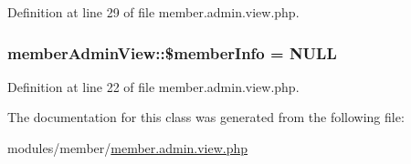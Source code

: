 Definition at line 29 of file member.\-admin.\-view.\-php.

\hypertarget{classmemberAdminView_a4955a7b9bc128c344a2987dd1cb8e043}{
\subsubsection[{\$member\-Info}]{\setlength{\rightskip}{0pt plus 5cm}member\-Admin\-View\-::\$member\-Info = N\-U\-L\-L}}\label{classmemberAdminView_a4955a7b9bc128c344a2987dd1cb8e043}


Definition at line 22 of file member.\-admin.\-view.\-php.



The documentation for this class was generated from the following file\-:\begin{DoxyCompactItemize}
\item 
modules/member/\hyperlink{member_8admin_8view_8php}{member.\-admin.\-view.\-php}\end{DoxyCompactItemize}
